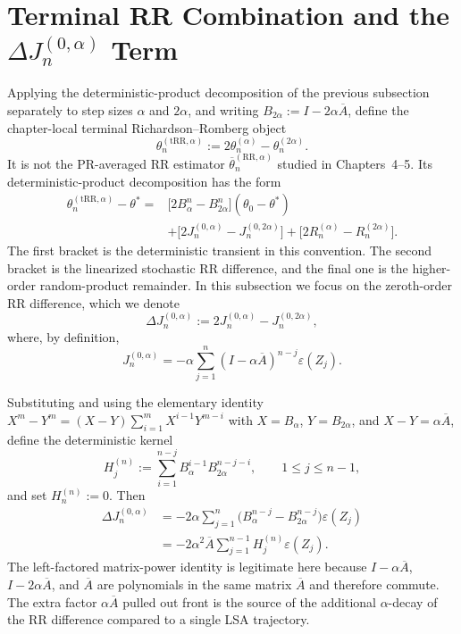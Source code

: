 \section{\texorpdfstring{Terminal RR Combination and the $\Delta J_n^{(0,\alpha)}$ Term}{Terminal RR Combination and the Delta J Term}}

Applying the deterministic-product decomposition of the previous subsection
separately to step sizes $\alpha$ and $2\alpha$, and writing
$B_{2\alpha}:=I-2\alpha\overline{A}$, define the chapter-local terminal
Richardson--Romberg object
\[
  \theta_n^{(\mathrm{tRR},\alpha)}
    :=2\theta_n^{(\alpha)}-\theta_n^{(2\alpha)}.
\]
It is not the PR-averaged RR estimator
$\overline{\theta}_n^{(\mathrm{RR},\alpha)}$ studied in Chapters~4--5. Its
deterministic-product decomposition has the form
\[
  \begin{aligned}
    \theta_n^{(\mathrm{tRR},\alpha)}-\theta^*
      ={}&\bigl[2B_\alpha^n-B_{2\alpha}^n\bigr](\theta_0-\theta^*) \\
       &+\bigl[2J_n^{(0,\alpha)}-J_n^{(0,2\alpha)}\bigr]
        +\bigl[2R_n^{(\alpha)}-R_n^{(2\alpha)}\bigr].
  \end{aligned}
\]
The first bracket is the deterministic transient in this convention. The
second bracket is the linearized stochastic RR difference, and the final one
is the higher-order random-product remainder. In this subsection we focus on
the zeroth-order RR difference, which we denote
\[
  \Delta J_n^{(0,\alpha)}
    :=2J_n^{(0,\alpha)}-J_n^{(0,2\alpha)},
\]
where, by definition,
\[
  J_n^{(0,\alpha)}
    =-\alpha\sum_{j=1}^n
      (I-\alpha\overline{A})^{n-j}\varepsilon(Z_j).
\]

Substituting and using the elementary identity
$X^m-Y^m=(X-Y)\sum_{i=1}^mX^{i-1}Y^{m-i}$ with $X=B_\alpha$,
$Y=B_{2\alpha}$, and $X-Y=\alpha\overline{A}$, define the deterministic
kernel
\[
  H_j^{(n)}
    :=\sum_{i=1}^{n-j}
      B_\alpha^{i-1}B_{2\alpha}^{n-j-i},
  \qquad 1\leq j\leq n-1,
\]
and set $H_n^{(n)}:=0$. Then
\[
  \begin{aligned}
    \Delta J_n^{(0,\alpha)}
      &=-2\alpha\sum_{j=1}^n
        \bigl(B_\alpha^{n-j}-B_{2\alpha}^{n-j}\bigr)\varepsilon(Z_j) \\
      &=-2\alpha^2\overline{A}\sum_{j=1}^{n-1}
        H_j^{(n)}\varepsilon(Z_j).
  \end{aligned}
\]
The left-factored matrix-power identity is legitimate here because
$I-\alpha\overline{A}$, $I-2\alpha\overline{A}$, and $\overline{A}$ are
polynomials in the same matrix $\overline{A}$ and therefore commute. The extra
factor $\alpha\overline{A}$ pulled out front is the source of the additional
$\alpha$-decay of the RR difference compared to a single LSA trajectory.
